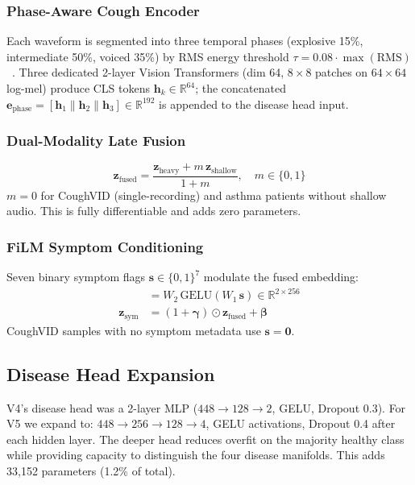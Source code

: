\documentclass[journal]{IEEEtran}
\newcommand{\R}{\mathbb{R}}
\begin{document}
\subsubsection{Phase-Aware Cough Encoder}

Each waveform is segmented into three temporal phases
(explosive 15\%, intermediate 50\%, voiced 35\%) by RMS energy
threshold $\tau = 0.08\cdot\max(\text{RMS})$~\cite{shi2018phases}.
Three dedicated 2-layer Vision Transformers (dim 64, $8{\times}8$
patches on $64{\times}64$ log-mel) produce CLS tokens
$\mathbf{h}_k\in\R^{64}$; the concatenated
$\mathbf{e}_\text{phase} = [\mathbf{h}_1\|\mathbf{h}_2\|\mathbf{h}_3]
\in\R^{192}$ is appended to the disease head input.

\subsubsection{Dual-Modality Late Fusion}

\begin{equation}
\mathbf{z}_\text{fused} = \frac{\mathbf{z}_\text{heavy}
  + m\,\mathbf{z}_\text{shallow}}{1 + m}, \quad
m \in \{0,1\}
\label{eq:lf}
\end{equation}
$m{=}0$ for CoughVID (single-recording) and asthma patients without
shallow audio. This is fully differentiable and adds zero parameters.

\subsubsection{FiLM Symptom Conditioning}

Seven binary symptom flags $\mathbf{s}\in\{0,1\}^7$ modulate the
fused embedding:
\begin{align}
[\boldsymbol{\gamma},\boldsymbol{\beta}] &=
  W_2\,\mathrm{GELU}(W_1\,\mathbf{s}) \in \R^{2\times256}
\label{eq:film_params}\\
\mathbf{z}_\text{sym} &= (1 + \boldsymbol{\gamma})
  \odot \mathbf{z}_\text{fused} + \boldsymbol{\beta}
\label{eq:film}
\end{align}
CoughVID samples with no symptom metadata use $\mathbf{s}=\mathbf{0}$.

\subsection{Disease Head Expansion}
\label{sec:head}

V4's disease head was a 2-layer MLP
($448{\to}128{\to}2$, GELU, Dropout 0.3). For V5 we expand to:
$448{\to}256{\to}128{\to}4$, GELU activations, Dropout 0.4 after
each hidden layer. The deeper head reduces overfit on the majority
healthy class while providing capacity to distinguish the four
disease manifolds. This adds 33,152 parameters (1.2\% of total).
\end{document}
